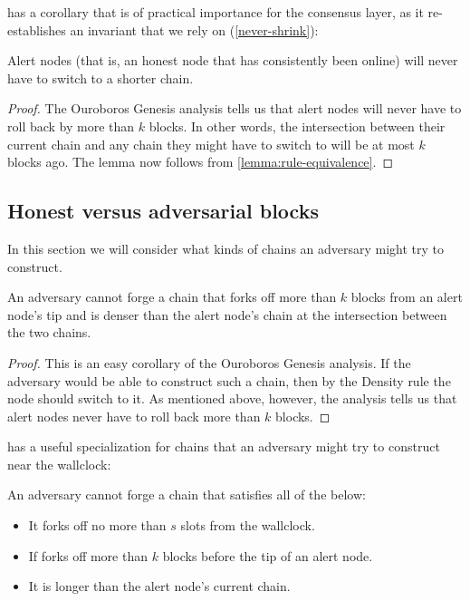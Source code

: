  has a corollary that is of practical importance
for the consensus layer, as it re-establishes an invariant that we rely on
(\cref{never-shrink}):

\begin{lemma}
Alert nodes (that is, an honest node that has consistently been online)
will never have to switch to a shorter chain.
\end{lemma}

\begin{proof}
The Ouroboros Genesis analysis \cite{cryptoeprint:2018:378} tells us that
alert nodes will never have to roll back by more than $k$ blocks. In other
words, the intersection between their current chain and any chain they might
have to switch to will be at most $k$ blocks ago. The lemma now follows
from \cref{lemma:rule-equivalence}.
\end{proof}

\subsection{Honest versus adversarial blocks}

In this section we will consider what kinds of chains an adversary might try to
construct.

\begin{lemma}
\label{lemma:adversarial-before-k}
An adversary cannot forge a chain that forks off more than $k$ blocks from an
alert node's tip and is denser than the alert node's chain at the intersection
between the two chains.
\end{lemma}

\begin{proof}
This is an easy corollary of the Ouroboros Genesis analysis. If the adversary
would be able to construct such a chain, then by the Density rule the node
should switch to it. As mentioned above, however, the analysis tells us that
alert nodes never have to roll back more than $k$ blocks.
\end{proof}

 has a useful specialization for chains that an
adversary might try to construct near the wallclock:

\begin{lemma}
\label{lemma:adversarial-within-s}
An adversary cannot forge a chain that satisfies all of the below:
%
\begin{itemize}
\item It forks off no more than $s$ slots from the wallclock.
\item If forks off more than $k$ blocks before the tip of an alert node.
\item It is longer than the alert node's current chain.
\end{itemize}
\end{lemma}

